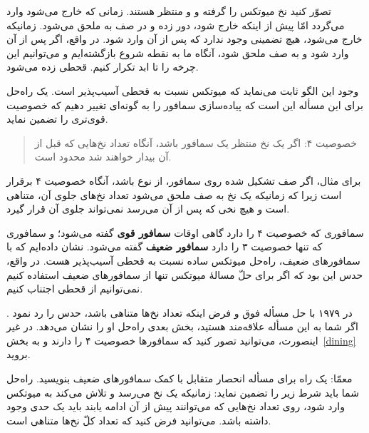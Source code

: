 \documentclass{book}
\begin{document}
    تصوّر کنید نخ  میوتکس را گرفته و  و  منتظر هستند. 
    زمانی که  خارج می‌شود  وارد می‌گردد امّا پیش از اینکه   خارج شود،   دور زده و در صف به   ملحق می‌شود. 
    زمانیکه   خارج می‌شود، هیچ تضمینی وجود ندارد که  پس از آن   وارد شود. در واقع، اگر پس از آن  وارد شود و   
    به صف ملحق شود، آنگاه ما به نقطه  شروع بازگشته‌ایم و می‌توانیم این چرخه را تا ابد تکرار کنیم.  قحطی زده می‌شود. 

    وجود این الگو ثابت می‌نماید که میوتکس نسبت به قحطی آسیب‌پذیر است. 
    یک راه‌حل برای این مسأله این است که پیاده‌سازی سمافور را به گونه‌ای تغییر دهیم که خصوصیت قوی‌تری را تضمین نماید. 

\begin{quote}
    خصوصیت ۴: اگر یک نخ منتظر یک سمافور باشد، آنگاه تعداد نخ‌هایی که قبل از آن بیدار خواهند شد محدود است. 
\end{quote}

    برای مثال، اگر صف تشکیل شده روی سمافور، از نوع   باشد،
    آنگاه خصوصیت ۴ برقرار است زیرا که زمانیکه یک نخ به صف ملحق می‌شود تعداد نخ‌های جلوی آن، متناهی است و هیچ نخی که پس از آن می‌رسد 
    نمی‌تواند جلوی آن قرار گیرد. 

    سمافوری که خصوصیت ۴ را دارد گاهی اوقات \textbf{سمافور قوی} گفته می‌شود؛ و 
    سمافوری که تنها خصوصیت ۳ را دارد \textbf{سمافور ضعیف} گفته می‌شود.
    نشان‌ داده‌ایم که  با سمافورهای ضعیف، راه‌حل میوتکس ساده نسبت به قحطی آسیب‌پذیر هست.
    در واقع، حدس  این بود که اگر برای حلّ مسالهٔ میوتکس تنها از سمافورهای ضعیف استفاده کنیم نمی‌توانیم از قحطی اجتناب کنیم. 

    در ۱۹۷۹  با حل مسأله فوق و فرض اینکه تعداد نخ‌ها متناهی باشد، حدس    را رد نمود \cite{morris}. 
    اگر شما به این مسأله علاقه‌مند هستید، بخش بعدی راه‌حل او را نشان می‌دهد. در غیر اینصورت، می‌توانید تصور کنید که سمافورها خصوصیت ۴ 
    را دارند و به بخش~\ref{dining} بروید. 

    معمّا: یک راه برای مسأله انحصار متقابل با کمک سمافورهای ضعیف بنویسید. راه‌حل شما باید شرط زیر را تضمین نماید: 
    زمانیکه یک نخ می‌رسد و تلاش می‌کند به میوتکس وارد شود،  روی تعداد نخ‌هایی که می‌توانند پیش از آن ادامه یابند باید یک حدی وجود داشته باشد. 
    می‌توانید فرض کنید که تعداد کلّ نخ‌ها متناهی است. 
    
\end{document}
